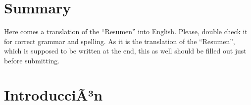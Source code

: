 \documentclass[a4paper, 12pt]{book}
\begin{document}

\chapter*{Summary}

Here comes a translation of the ``Resumen'' into English. Please, double check
it for correct grammar and spelling. As it is the translation of the ``Resumen'',
which is supposed to be written at the end, this as well should be filled out
just before submitting.




\tableofcontents
\cleardoublepage
\listoffigures %



\cleardoublepage
\chapter{IntroducciÃ³n}
\label{sec:intro} %
\end{document}
